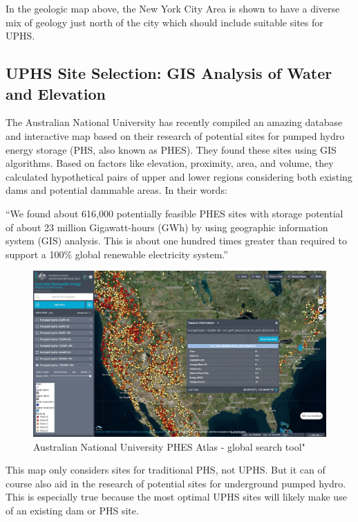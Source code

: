 \documentclass[hidelinks,12pt,a4paper]{article}
\begin{document}
In the geologic map above, the New York City Area is shown to have a diverse mix of geology just north of the city which should include suitable sites for UPHS.

\subsection{UPHS Site Selection: GIS Analysis of Water and Elevation}
The Australian National University has recently compiled an amazing database and interactive map based on their research of potential sites for pumped hydro energy storage (PHS, also known as PHES). They found these sites using GIS algorithms. Based on factors like elevation, proximity, area, and volume, they calculated hypothetical pairs of upper and lower regions considering both existing dams and potential dammable areas. In their words:

\begin{displayquote}
“We found about 616,000 potentially feasible PHES sites with storage potential of about 23 million Gigawatt-hours (GWh) by using geographic information system (GIS) analysis. This is about one hundred times greater than required to support a 100\% global renewable electricity system.”
\end{displayquote}

\begin{figure}[ht!]
    \centering
    \includegraphics[width=1\textwidth]{australian-national-university-global-phes-atlas.jpg}
    \caption{Australian National University PHES Atlas - global search tool" \cite{AustralianNationalUniversityGlobalPHESAtlas}}
\end{figure}
\FloatBarrier

This map only considers sites for traditional PHS, not UPHS. But it can of course also aid in the research of potential sites for underground pumped hydro. This is especially true because the most optimal UPHS sites will likely make use of an existing dam or PHS site.
\end{document}
